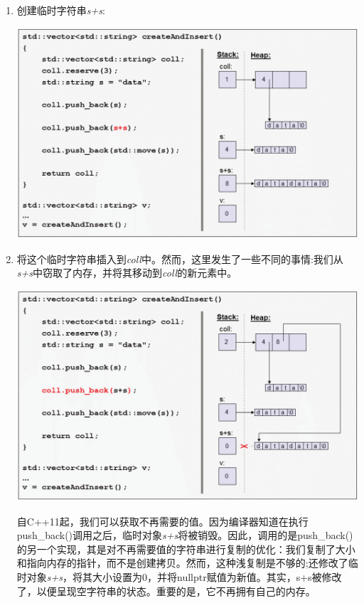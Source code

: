 \begin{itemize}
\begin{enumerate}
		\item 创建临时字符串\textit{s+s}:\par
		\begin{center}
			\includegraphics[width=1.0\textwidth]{content/1/chapter1/images/11}
		\end{center}
		\item 将这个临时字符串插入到\textit{coll}中。然而，这里发生了一些不同的事情:我们从\textit{s+s}中窃取了内存，并将其移动到\textit{coll}的新元素中。\par
		\begin{center}
			\includegraphics[width=1.0\textwidth]{content/1/chapter1/images/12}
		\end{center}
		自C++11起，我们可以获取不再需要的值。因为编译器知道在执行push\_back()调用之后，临时对象\textit{s+s}将被销毁。因此，调用的是push\_back()的另一个实现，其是对不再需要值的字符串进行复制的优化：我们复制了大小和指向内存的指针，而不是创建拷贝。然而，这种浅复制是不够的;还修改了临时对象\textit{s+s}，将其大小设置为0，并将nullptr赋值为新值。其实，s+s被修改了，以便呈现空字符串的状态。重要的是，它不再拥有自己的内存。

\end{enumerate}
\end{itemize}
